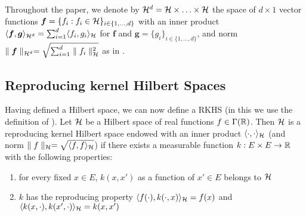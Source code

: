 Throughout the paper, we denote by $\mathcal{H}^d = \mathcal{H} \times \ldots \times \mathcal{H}$ the space of $d \times 1$ vector functions $\boldsymbol{f} = \{f_i: f_i \in \mathcal{H}\}_{i \in \{1, \ldots, d\}}$ with an inner product $\langle \boldsymbol{f}, \boldsymbol{g} \rangle_{\mathcal{H}^d} = \sum_{i =1}^d \langle f_i, g_i \rangle_{\mathcal{H}}$ for $\boldsymbol{f}$ and $\boldsymbol{g} = \{g_i\}_{i  \in \{1, \ldots, d\}}$, and norm $\parallel \boldsymbol{f} \parallel_{\mathcal{H}^d} = \sqrt{\sum_{i=1}^d \parallel f_i \parallel_{\mathcal{H}}^2}$ as in \cite{liu2016kernelized}.

\subsection{Reproducing kernel Hilbert Spaces}
Having defined a Hilbert space, we can now define a RKHS (in this we use the definition of \cite{rasmussen2006gaussian}). Let $\mathcal{H}$ be a Hilbert space of real functions $f \in \Gamma(\mathbb{R})$. Then $\mathcal{H}$ is a reproducing kernel Hilbert space endowed with an inner product $\langle \cdot, \cdot \rangle_{\mathcal{H}}$ (and norm $\parallel f \parallel_{\mathcal{H}}= \sqrt{\langle f, f \rangle_{\mathcal{H}}}$) if there exists a measurable function $k: E \times E \rightarrow \mathbb{R}$ with the following properties:
\begin{enumerate}
	\item for every fixed $x \in E$, $k(x, x')$ as a function of $x' \in E$ belongs to $\mathcal{H}$
	\item $k$ has the reproducing property $\langle f(\cdot), k(\cdot, x)\rangle_{\mathcal{H}} = f(x)$ and $\langle k(x, \cdot), k(x', \cdot) \rangle_{\mathcal{H}} = k(x, x')$
\end{enumerate}
